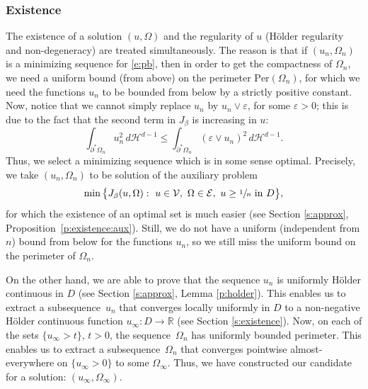 \documentclass[11pt]{article}
\numberwithin{equation}{section}
\newcommand{\Per}{\mathrm{Per}}
\theoremstyle{plain}
\theoremstyle{definition}
\let\ds\displaystyle
\let\eps\varepsilon
\def\R{\mathbb{R}}
\def\HH{\mathcal{H}}
\begin{document}
\subsubsection{Existence}The existence of a solution $(u,\Omega)$ and the regularity of $u$ (Hölder regularity and non-degeneracy) are treated simultaneously. The reason is that if $(u_n,\Omega_n)$ is a minimizing sequence for \eqref{e:pb}, then in order to get the compactness of $\Omega_n$, we need a uniform bound (from above) on the perimeter $\Per(\Omega_n)$, for which we need the functions $u_n$ to be bounded from below by a strictly positive constant. Now, notice that we cannot simply replace $u_n$ by $u_n\vee \eps$, for some $\eps>0$; this is due to the fact that the second term in $J_\beta$ is increasing in $u$: \[\ds\int_{\partial^\ast\Omega_n}u_n^2\,d\HH^{d-1}\le \int_{\partial^\ast\Omega_n}(\eps\vee u_n)^2\,d\HH^{d-1}.\]
Thus, we select a minimizing sequence which is in some sense optimal. Precisely, we take $(u_n,\Omega_n)$ to be solution of the auxiliary problem
\begin{equation}\label{e:pb_approx_intro}
\min\big\{J_\beta(u,\Omega):\ u\in\mathcal V,\ \Omega\in\mathcal E,\ u\ge \sfrac1n\ \text{in}\ D\big\},
\end{equation}
for which the existence of an optimal set is much easier (see Section \ref{s:approx}, Proposition~\ref{p:existence:aux}). Still, we do not have a uniform (independent from $n$) bound from below for the functions $u_n$, so we still miss the uniform bound on the perimeter of $\Omega_n$.

On the other hand, we are able to prove that the sequence $u_n$ is uniformly Hölder continuous in $D$ (see Section \ref{s:approx}, Lemma \ref{p:holder}). This enables us to extract a subsequence~$u_n$ that converges locally uniformly in $D$ to a non-negative Hölder continuous function $u_\infty:D\to\R$ (see Section \ref{s:existence}). Now, on each of the sets $\{u_\infty>t\}$, $t>0$, the sequence~$\Omega_n$ has uniformly bounded perimeter. This enables us to extract a subsequence~$\Omega_n$ that converges pointwise almost-everywhere on $\{u_\infty>0\}$ to some $\Omega_\infty$. Thus, we have constructed our candidate for a solution: $(u_\infty,\Omega_\infty)$.
\end{document}
